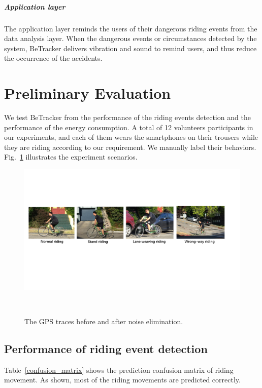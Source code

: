 \documentclass{sigchi-ext}
\def\sysname{BeTracker }
\begin{document}
\subparagraph{Application layer}
The application layer reminds the users of their dangerous riding events from the data analysis layer. When the dangerous events or circumstances detected by the system, \sysname delivers vibration and sound to remind users, and thus reduce the occurrence of the accidents. 

\section{Preliminary Evaluation}
We test \sysname from the performance of the riding events detection and the performance of the energy consumption. A total of 12 volunteers participants in our experiments, and each of them wears the smartphones on their trousers while they are riding according to our requirement. We manually label their behaviors. Fig.~\ref{fig:experiment_riding} illustrates the experiment scenarios. 

\begin{figure}[h]
	\includegraphics[width=1\columnwidth]{figures/experiment_riding.pdf}
	\caption{The GPS traces before and after noise elimination.}~\label{fig:experiment_riding}
\end{figure}
\subsection{Performance of riding event detection}
Table~\ref{confusion_matrix} shows the  prediction confusion matrix of riding movement. As shown, most of the riding movements are predicted correctly.     
\end{document}
